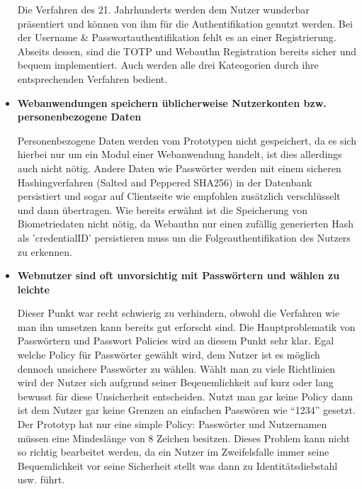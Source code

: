 \begin{itemize}
Die Verfahren des 21. Jahrhunderts werden dem Nutzer wunderbar präsentiert und können von ihm für die Authentifikation genutzt werden. Bei der Username \& Passwortauthentifikation fehlt es an einer Registrierung. Abseits dessen, sind die TOTP und Webauthn Registration bereits sicher und bequem implementiert. Auch werden alle drei Kateogorien durch ihre entsprechenden Verfahren bedient.

\item \textbf{Webanwendungen speichern üblicherweise Nutzerkonten bzw. personenbezogene Daten}

Personenbezogene Daten werden vom Prototypen nicht gespeichert, da es sich hierbei nur um ein Modul einer Webanwendung handelt, ist dies allerdings auch nicht nötig. Andere Daten wie Passwörter werden mit einem sicheren Hashingverfahren (Salted and Peppered SHA256) in der Datenbank persistiert und sogar auf Clientseite wie empfohlen zusätzlich verschlüsselt und dann übertragen. Wie bereits erwähnt ist die Speicherung von Biometriedaten nicht nötig, da Webauthn nur einen zufällig generierten Hash als 'credentialID' persistieren muss um die Folgeauthentifikation des Nutzers zu erkennen.

\item \textbf{Webnutzer sind oft unvorsichtig mit Passwörtern und wählen zu leichte}

Dieser Punkt war recht schwierig zu verhindern, obwohl die Verfahren wie man ihn umsetzen kann bereits gut erforscht sind. Die Hauptproblematik von Passwörtern und Passwort Policies wird an diesem Punkt sehr klar. Egal welche Policy für Passwörter gewählt wird, dem Nutzer ist es möglich dennoch unsichere Passwörter zu wählen. Wählt man zu viele Richtlinien wird der Nutzer sich aufgrund seiner Beqeuemlichkeit auf kurz oder lang bewusst für diese Unsicherheit entscheiden. Nutzt man gar keine Policy dann ist dem Nutzer gar keine Grenzen an einfachen Passwören wie ``1234'' gesetzt. Der Prototyp hat nur eine simple Policy: Passwörter und Nutzernamen müssen eine Mindeslänge von 8 Zeichen besitzen. Dieses Problem kann nicht so richtig bearbeitet werden, da ein Nutzer im Zweifelsfalle immer seine Bequemlichkeit vor seine Sicherheit stellt was dann zu Identitätsdiebstahl usw. führt.
\end{itemize}

